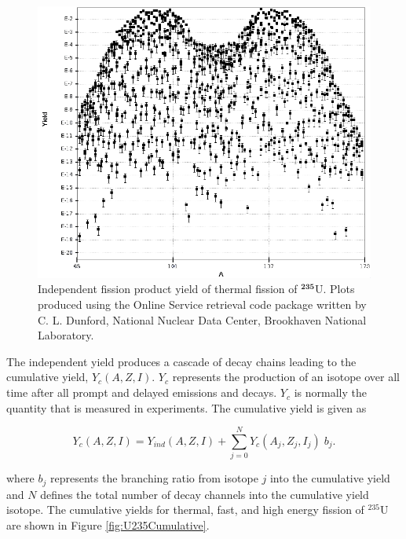 \begin{figure}[htb!]
	\includegraphics[width=\linewidth]{Figures/Chapter2/indfy.png}
	\caption[Independent fission product yield of thermal fission of $\mathrm{^{235}}$U]{Independent fission product yield of thermal fission of $\mathbf{^{235}}$U. Plots produced using the Online Service retrieval code package written by C. L. Dunford, National Nuclear Data Center, Brookhaven National Laboratory.}
	\label{fig:indy}
\end{figure}

The independent yield produces a cascade of decay chains leading to the cumulative yield, $Y_{c}(A,Z,I)$. $Y_{c}$ represents the production of an isotope over all time after all prompt and delayed emissions and decays. $Y_{c}$ is normally the quantity that is measured in experiments. The cumulative yield is given as \cite{Privas2016}

\begin{equation} \label{eq:Cumulative}
Y_{c}(A,Z,I) = Y_{ind}(A,Z,I) + \sum_{j=0}^N Y_{c}(A_{j},Z_{j},I_{j}) \; b_{j}.
\end{equation}

\noindent where $b_{j}$ represents the branching ratio from isotope $j$ into the cumulative yield and $N$ defines the total number of decay channels into the cumulative yield isotope. 
The cumulative yields for thermal, fast, and high energy fission of $^{235}$U are shown in Figure \ref{fig:U235Cumulative}. 


